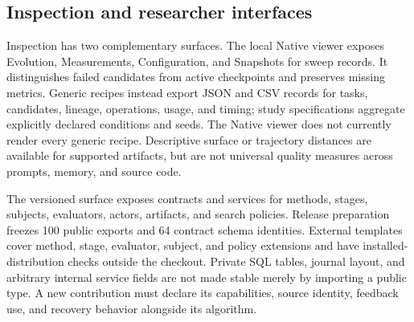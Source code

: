 \subsection{Inspection and researcher interfaces}
Inspection has two complementary surfaces. The local Native viewer exposes Evolution, Measurements, Configuration, and Snapshots for sweep records. It distinguishes failed candidates from active checkpoints and preserves missing metrics. Generic recipes instead export JSON and CSV records for tasks, candidates, lineage, operations, usage, and timing; study specifications aggregate explicitly declared conditions and seeds. The Native viewer does not currently render every generic recipe. Descriptive surface or trajectory distances are available for supported artifacts, but are not universal quality measures across prompts, memory, and source code.

The versioned  surface exposes contracts and services for methods, stages, subjects, evaluators, actors, artifacts, and search policies. Release preparation freezes 100 public exports and 64 contract schema identities. External templates cover method, stage, evaluator, subject, and policy extensions and have installed-distribution checks outside the checkout. Private SQL tables, journal layout, and arbitrary internal service fields are not made stable merely by importing a public type. A new contribution must declare its capabilities, source identity, feedback use, and recovery behavior alongside its algorithm.
